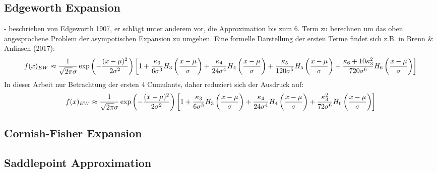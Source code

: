 \subsection{Edgeworth Expansion}
- beschrieben von Edgeworth 1907, er schlägt unter anderem vor, die Approximation bis zum 6. Term zu berechnen um das oben angesprochene Problem der asympotischen Expansion zu umgehen. Eine formelle Darstellung der ersten Terme findet sich z.B. in Brenn & Anfinsen (2017):
\begin{align}
    f(x)_{EW} \approx \frac{1}{\sqrt{2\pi}\sigma}\exp\left(-\frac{(x-\mu)^2}{2\sigma^2}\right) \left[1 + \frac{\kappa_3}{6\sigma^3}H_3\left(\frac{x-\mu}{\sigma}\right) + \frac{\kappa_4}{24\sigma^4}H_4\left(\frac{x-\mu}{\sigma}\right) + \frac{\kappa_5}{120\sigma^5}H_5\left(\frac{x-\mu}{\sigma}\right) + \frac{\kappa_6 + 10\kappa_3^2}{720\sigma^6}H_6\left(\frac{x-\mu}{\sigma}\right)\right] \notag
\end{align}
In dieser Arbeit nur Betrachtung der ersten 4 Cumulants, daher reduziert sich der Ausdruck auf:
\begin{align}
    f(x)_{EW} \approx \frac{1}{\sqrt{2\pi}\sigma}\exp\left(-\frac{(x-\mu)^2}{2\sigma^2}\right) \left[1 + \frac{\kappa_3}{6\sigma^3}H_3\left(\frac{x-\mu}{\sigma}\right) + \frac{\kappa_4}{24\sigma^4}H_4\left(\frac{x-\mu}{\sigma}\right) + \frac{\kappa_3^2}{72\sigma^6}H_6\left(\frac{x-\mu}{\sigma}\right)\right] \notag
\end{align}


\subsection{Cornish-Fisher Expansion}

\subsection{Saddlepoint Approximation}